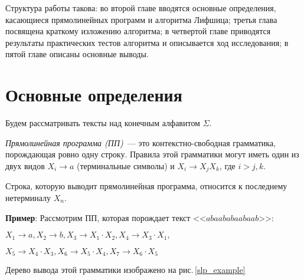 \documentclass[14pt]{article}
\begin{document}
Структура работы такова: во второй главе вводятся основные определения, касающиеся прямолинейных программ и алгоритма Лифшица; третья глава посвящена краткому изложению алгоритма; в четвертой главе приводятся результаты практических тестов алгоритма и описывается ход исследования; в пятой главе описаны основные выводы.

\section{Основные определения}
Будем рассматривать тексты над конечным алфавитом $\Sigma$. 

\emph{Прямолинейная программа (ПП)}~--- это контекстно-свободная грамматика, порождающая ровно одну строку.
Правила этой грамматики могут иметь один из двух видов $X_i \to a$ (терминальные символы) и $X_i \to X_j X_k$, где $i > j, k$.

Строка, которую выводит прямолинейная программа, относится к последнему нетерминалу $X_n$. 

{\bf Пример}: Рассмотрим ПП, которая порождает текст <<$abaababaabaab$>>:

\begin{center}
$X_1 \to a, X_2 \to b, X_3 \to X_1\cdot X_2, X_4 \to X_3\cdot X_1,$

$X_5 \to X_4\cdot X_3, X_6 \to X_5\cdot X_4, X_7 \to X_6\cdot X_5$
\end{center}

Дерево вывода этой грамматики изображено на рис.\,\ref{slp_example}
\end{document}
